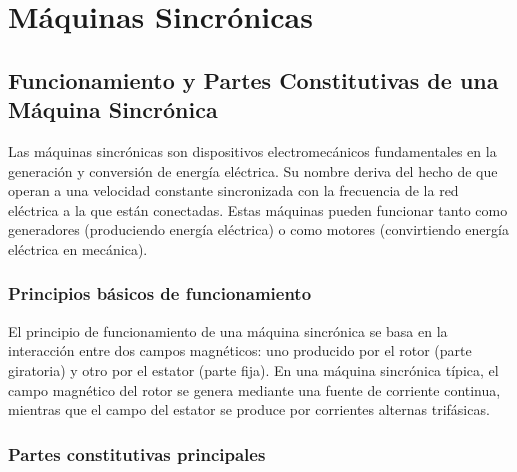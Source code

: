 \documentclass[../main]{subfiles}
\begin{document}
\setcounter{chapter}{6}
\chapter{Máquinas Sincrónicas}

\section{Funcionamiento y Partes Constitutivas de una Máquina Sincrónica}

Las máquinas sincrónicas son dispositivos electromecánicos fundamentales en la generación y conversión de energía eléctrica. Su nombre deriva del hecho de que operan a una velocidad constante sincronizada con la frecuencia de la red eléctrica a la que están conectadas. Estas máquinas pueden funcionar tanto como generadores (produciendo energía eléctrica) o como motores (convirtiendo energía eléctrica en mecánica).

\subsection{Principios básicos de funcionamiento}

El principio de funcionamiento de una máquina sincrónica se basa en la interacción entre dos campos magnéticos: uno producido por el rotor (parte giratoria) y otro por el estator (parte fija). En una máquina sincrónica típica, el campo magnético del rotor se genera mediante una fuente de corriente continua, mientras que el campo del estator se produce por corrientes alternas trifásicas.


\subsection{Partes constitutivas principales}
\end{document}
